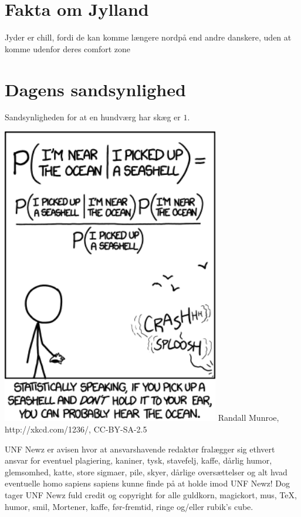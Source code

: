 \begin{minipage}[b]{0.95\linewidth}
\begin{minipage}[t]{0.47\textwidth}
\vspace{-2mm}
\section*{Fakta om Jylland}
Jyder er chill, fordi de kan komme længere nordpå end andre danskere, uden at komme udenfor deres comfort zone

\vspace{-2mm}
\section*{Dagens sandsynlighed}
Sandsynligheden for at en hundværg har skæg er $1$.

\vspace{1mm}
\includegraphics[width=95mm]{seashell.png}
\tiny Randall Munroe, http://xkcd.com/1236/, CC-BY-SA-2.5
\end{minipage}

\begin{center}
\tiny UNF Newz er avisen hvor at ansvarshavende redaktør fralægger sig ethvert ansvar for eventuel plagiering, kaniner, tysk, stavefelj, kaffe, dårlig humor, glemsomhed, katte, store sigmaer, pile, skyer, dårlige oversættelser og alt hvad eventuelle homo sapiens sapiens kunne finde på at holde imod UNF Newz! Dog tager UNF Newz fuld credit og copyright for alle guldkorn, magickort, mus, \TeX, humor, smil, Mortener, kaffe, før-fremtid, ringe og/eller rubik's cube.
\end{center}
\end{minipage}

